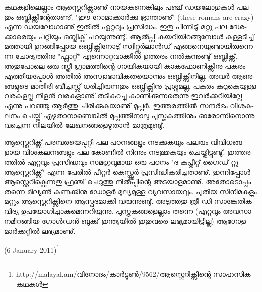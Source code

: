 ­ക­ഥ­ക­ളി­ലെ­ല്ലാം ആസ്റ്റെ­റി­ക്സാ­ണു് നാ­യ­ക­നെ­ങ്കി­ലും പഞ്ച് ഡയ­ലോ­ഗു­കള്‍ പല­തും ഒബ്ലി­ക്സി­ന്റേ­താ­ണു്. "ഈ റോ­മാ­ക്കാര്‍­ക്കു 
ഭ്രാ­ന്താ­ണു്" (these romans are crazy) എന്ന ഡയ­ലോ­ഗാ­ണു് ഇതില്‍ ഏറ്റ­വും പ്ര­സി­ദ്ധം. ഇതു പി­ന്നീ­ടു് മറ്റു പല 
ദേ­ശ­ക്കാ­രെ­യും പറ്റി­യും ഒബ്ലി­ക്സ് പറ­യു­ന്നു­ണ്ടു്. ആല്‍­പ്സ് കയ­റി­യി­റ­ങ്ങു­മ്പോള്‍ കള്ള­ടി­ച്ച് മത്താ­യി ഉറ­ങ്ങി­പ്പോയ 
ഒബ്ലി­ക്സി­നോ­ടു് ­സ്വി­റ്റ്സര്‍­ലാന്‍­ഡ് എങ്ങ­നെ­യു­ണ്ടാ­യി­രു­ന്നെ­ന്ന ചോ­ദ്യ­ത്തി­നു "ഫ്ലാ­റ്റ്" എന്നൊ­റ്റ­വാ­ക്കില്‍ ഉത്ത­രം 
നല്‍­കു­ന്നു­ണ്ടു് ഒബ്ലി­ക്സ്. അതു­പോ­ലെ ഒരു സ്ത്രീ ഗ്രാ­മ­ത്തി­ന്റെ ഗാ­യി­ക­യാ­യി കാ­ക­ഫോ­ണി­ക്സി­നു പക­രം എത്തി­യ­പ്പോള്‍ 
അതില്‍ അസ്വാ­ഭാ­വി­ക­ത­യൊ­ന്നും ഒബ്ലി­ക്സി­നി­ല്ല. അവര്‍ ആണു­ങ്ങ­ളു­ടെ മാ­തി­രി ബീ­ച്ച­സ്സ് ധരി­ച്ചി­രു­ന്ന­തും ഒബ്ലി­ക്സി­നു 
പ്ര­ശ്ന­മ­ല്ല, പക­രം കു­റു­കെ­യു­ള്ള വര­ക­ള­ല്ല നീ­ളന്‍ വര­ക­ളാ­ണു് തടി­കു­റ­ച്ചു കാ­ണി­ക്കു­ന്ന­തെ­ന്നു ഇവര്‍­ക്ക­റി­യി­ല്ലേ എന്നു 
പറ­ഞ്ഞു ആര്‍­ത്തു ചി­രി­ക്കു­ക­യാ­ണു് മൂ­പ്പര്‍. ഇത്ത­ര­ത്തില്‍ സന്ദര്‍­ഭം വി­ശ­ക­ല­നം ചെ­യ്തു് എഴു­താ­നാ­ണെ­ങ്കില്‍ മു­പ്പ­ത്തി­നാ­ലു 
പു­സ്ത­ക­ത്തി­നും ഓരോ­ന്നി­നൊ­ന്നു വച്ചെ­ന്ന നി­ല­യില്‍ ലേ­ഖ­ന­ങ്ങ­ളെ­ഴു­താന്‍ മാ­ത്ര­മു­ണ്ടു്.

ആ­സ്റ്റെ­റി­ക്സ് പര­മ്പ­ര­യെ­പ്പ­റ്റി പല പഠ­ന­ങ്ങ­ളും നട­ക്കു­ക­യും പല­രും വി­വി­ധ­ങ്ങ­ളായ വി­ശ­ക­ല­ന­ങ്ങ­ളും പല കോ­ണില്‍ നി­ന്നും
നട­ത്തു­ക­യും ചെ­യ്തി­ട്ടു­ണ്ടു്. ഇത്ത­ര­ത്തില്‍ ഏറ്റ­വും പ്ര­സി­ദ്ധ­വും സമ­ഗ്ര­വു­മായ ഒരു പഠ­നം "ദ കപ്ലീ­റ്റ് ഗൈ­ഡ് റ്റു ആസ്റ്റെ­റി­ക്സ്"
എന്ന പേ­രില്‍ പീ­റ്റര്‍ കെ­സ്സ്ലര്‍ പ്ര­സി­ദ്ധീ­ക­രി­ച്ച­താ­ണു്. ഇന്നി­പ്പോള്‍ ആസ്റ്റെ­റി­ക്സെ­ന്ന­തു ഫ്ര­ഞ്ച് ചെ­റു­ത്തു നില്‍­പ്പി­ന്റെ 
അട­യാ­ള­മാ­ണു്. അതോ­ടൊ­പ്പം തന്നെ മി­ല്യണ്‍ കണ­ക്കി­നു ഡോ­ളര്‍ മൂ­ല്യ­മു­ള്ള വ്യ­വ­സാ­യ­വും. പു­തിയ സി­നി­മ­ക­ളും മറ്റും
ആസ്റ്റെ­റി­ക്സി­നെ ആസ്പ­ദ­മാ­ക്കി വരു­ന്നു­ണ്ടു്. അടു­ത്ത­തു ത്രീ ഡി സാ­ങ്കേ­തിക വി­ദ്യ ഉപ­യോ­ഗി­ച്ചാ­കു­മെ­ന്ന­റി­യു­ന്നു. 
പു­സ്ത­ക­ങ്ങ­ളെ­ല്ലാം തന്നെ (എ­റ്റ­വും അവ­സാ­ന­മി­റ­ങ്ങിയ ഗോള്‍­ഡന്‍ ബു­ക്കു് ഇന്ത്യ­യില്‍ ഇതു­വ­രെ ലഭ്യ­മാ­യി­ട്ടി­ല്ല) 
ആഗോ­ള­മാര്‍­ക്ക­റ്റില്‍ ലഭ്യ­മാ­ണു്.

(6 January 2011)\footnote{http://malayal.am/വിനോദം/കാര്‍ട്ടൂണ്‍/9562/ആസ്റ്റെറിക്സിന്റെ-സാഹസിക-കഥകള്‍}

\newpage

